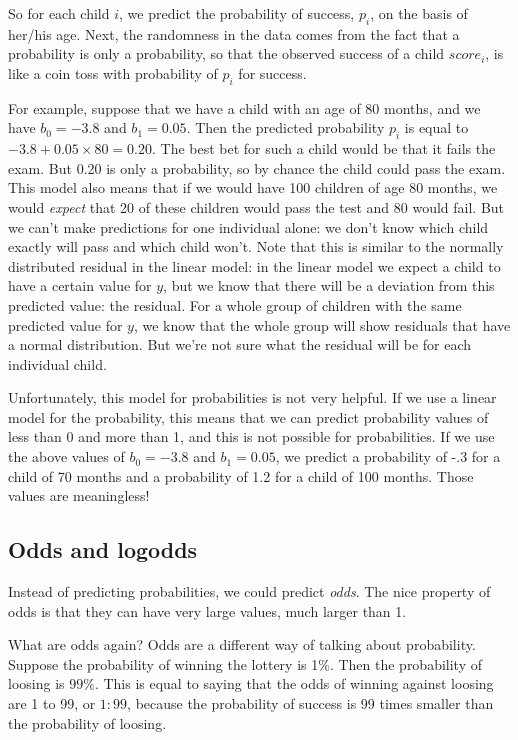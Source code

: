 \documentclass[]{report}\usepackage[]{graphicx}\usepackage[]{color}
\begin{document}
So for each child $i$, we predict the probability of success, $p_i$, on the basis of her/his age. Next, the randomness in the data comes from the fact that a probability is only a probability, so that the observed success of a child $score_i$, is like a coin toss with probability of $p_i$ for success.

For example, suppose that we have a child with an age of 80 months, and we have $b_0=-3.8$ and $b_1=0.05$. Then the predicted probability $p_i$ is equal to $-3.8 + 0.05 \times 80 = 0.20$. The best bet for such a child would be that it fails the exam. But 0.20 is only a probability, so by chance the child could pass the exam. This model also means that if we would have 100 children of age 80 months, we would \textit{expect} that 20 of these children would pass the test and 80 would fail.  But we can't make predictions for one individual alone: we don't know which child exactly will pass and which child won't. Note that this is similar to the normally distributed residual in the linear model: in the linear model we expect a child to have a certain value for $y$, but we know that there will be a deviation from this predicted value: the residual. For a whole group of children with the same predicted value for $y$, we know that the whole group will show residuals that have a normal distribution. But we're not sure what the residual will be for each individual child.

Unfortunately, this model for probabilities is not very helpful. If we use a linear model for the probability, this means that we can predict probability values of less than 0 and more than 1, and this is not possible for probabilities. If we use the above values of $b_0=-3.8$ and $b_1=0.05$, we predict a probability of -.3 for a child of 70 months and a probability of 1.2 for a child of 100 months. Those values are meaningless!



\subsection{Odds and logodds}
Instead of predicting probabilities, we could predict \textit{odds}. The nice property of odds is that they can have very large values, much larger than 1.

What are odds again? Odds are a different way of talking about probability. Suppose the probability of winning the lottery is 1\%. Then the probability of loosing is $99\%$. This is equal to saying that the odds of winning against loosing are 1 to 99, or $1:99$, because the probability of success is 99 times smaller than the probability of loosing.
\end{document}

